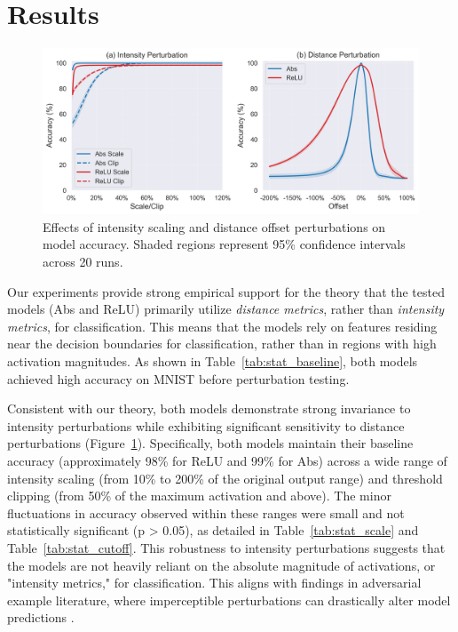 \section{Results}

\begin{figure}[ht]
  \centering
  \includegraphics[width=\textwidth]{images/perturbation_analysis}
  \caption{Effects of intensity scaling and distance offset perturbations on model accuracy. Shaded regions represent 95\% confidence intervals across 20 runs.}
  \label{fig:perturbation_analysis}
\end{figure}

Our experiments provide strong empirical support for the theory that the tested models (Abs and ReLU) primarily utilize \textit{distance metrics}, rather than \textit{intensity metrics}, for classification. This means that the models rely on features residing near the decision boundaries for classification, rather than in regions with high activation magnitudes. As shown in Table~\ref{tab:stat_baseline}, both models achieved high accuracy on MNIST \cite{lecun1998gradient} before perturbation testing. 

Consistent with our theory, both models demonstrate strong invariance to intensity perturbations while exhibiting significant sensitivity to distance perturbations (Figure~\ref{fig:perturbation_analysis}). Specifically, both models maintain their baseline accuracy (approximately 98\% for ReLU and 99\% for Abs) across a wide range of intensity scaling (from 10\% to 200\% of the original output range) and threshold clipping (from 50\% of the maximum activation and above). The minor fluctuations in accuracy observed within these ranges were small and not statistically significant (p > 0.05), as detailed in Table~\ref{tab:stat_scale} and Table~\ref{tab:stat_cutoff}. This robustness to intensity perturbations suggests that the models are not heavily reliant on the absolute magnitude of activations, or "intensity metrics," for classification. This aligns with findings in adversarial example literature, where imperceptible perturbations can drastically alter model predictions \cite{szegedy2013intriguing, goodfellow2014explaining}.


